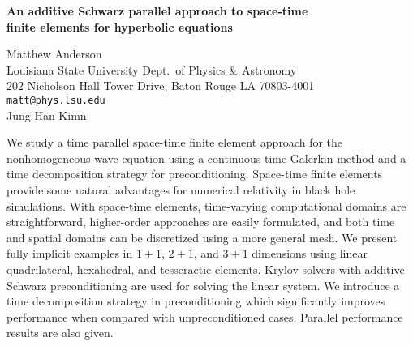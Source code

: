 \documentclass{report}
\begin{document}

\begin{center}
{\large
{\bf An additive Schwarz parallel approach to space-time \\
finite elements for hyperbolic equations}}

	Matthew Anderson \\
	Louisiana State University Dept.~of Physics \& Astronomy \\
	202 Nicholson Hall Tower Drive,  Baton Rouge LA 70803-4001 \\
	{\tt matt@phys.lsu.edu} \\
	Jung-Han Kimn
\end{center}
We study a time parallel space-time finite element approach
for the nonhomogeneous wave equation using a continuous time
Galerkin method and a time decomposition strategy for
preconditioning. Space-time finite elements provide some
natural advantages for numerical relativity in black hole
simulations. With space-time elements, time-varying
computational domains are straightforward, higher-order
approaches are easily formulated, and both time and spatial
domains can be discretized using a more general mesh. We
present fully implicit examples in $1+1$, $2+1$, and $3+1$
dimensions using linear quadrilateral, hexahedral, and
tesseractic elements. Krylov solvers with additive Schwarz
preconditioning are used for solving the linear system. We
introduce a time decomposition strategy in preconditioning
which significantly improves performance when compared with
unpreconditioned cases. Parallel performance results are
also given.




\end{document}
